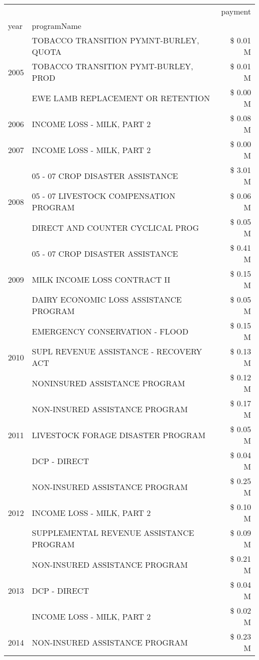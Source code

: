 \begin{tabular}{llr}
\toprule
 &  & payment \\
year & programName &  \\
\midrule
\multirow[t]{3}{*}{2005} & TOBACCO TRANSITION PYMNT-BURLEY, QUOTA & \$ 0.01 M \\
 & TOBACCO TRANSITION PYMT-BURLEY, PROD & \$ 0.01 M \\
 & EWE LAMB REPLACEMENT OR RETENTION & \$ 0.00 M \\
\cline{1-3}
2006 & INCOME LOSS - MILK, PART 2 & \$ 0.08 M \\
\cline{1-3}
2007 & INCOME LOSS - MILK, PART 2 & \$ 0.00 M \\
\cline{1-3}
\multirow[t]{3}{*}{2008} & 05 - 07 CROP DISASTER ASSISTANCE & \$ 3.01 M \\
 & 05 - 07 LIVESTOCK COMPENSATION PROGRAM & \$ 0.06 M \\
 & DIRECT AND COUNTER CYCLICAL PROG & \$ 0.05 M \\
\cline{1-3}
\multirow[t]{3}{*}{2009} & 05 - 07 CROP DISASTER ASSISTANCE & \$ 0.41 M \\
 & MILK INCOME LOSS CONTRACT II & \$ 0.15 M \\
 & DAIRY ECONOMIC LOSS ASSISTANCE PROGRAM & \$ 0.05 M \\
\cline{1-3}
\multirow[t]{3}{*}{2010} & EMERGENCY CONSERVATION - FLOOD & \$ 0.15 M \\
 & SUPL REVENUE ASSISTANCE - RECOVERY ACT & \$ 0.13 M \\
 & NONINSURED ASSISTANCE PROGRAM & \$ 0.12 M \\
\cline{1-3}
\multirow[t]{3}{*}{2011} & NON-INSURED ASSISTANCE PROGRAM & \$ 0.17 M \\
 & LIVESTOCK FORAGE DISASTER PROGRAM & \$ 0.05 M \\
 & DCP - DIRECT & \$ 0.04 M \\
\cline{1-3}
\multirow[t]{3}{*}{2012} & NON-INSURED ASSISTANCE PROGRAM & \$ 0.25 M \\
 & INCOME LOSS - MILK, PART 2 & \$ 0.10 M \\
 & SUPPLEMENTAL REVENUE ASSISTANCE PROGRAM & \$ 0.09 M \\
\cline{1-3}
\multirow[t]{3}{*}{2013} & NON-INSURED ASSISTANCE PROGRAM & \$ 0.21 M \\
 & DCP - DIRECT & \$ 0.04 M \\
 & INCOME LOSS - MILK, PART 2 & \$ 0.02 M \\
\cline{1-3}
\multirow[t]{3}{*}{2014} & NON-INSURED ASSISTANCE PROGRAM & \$ 0.23 M \\

\end{tabular}
